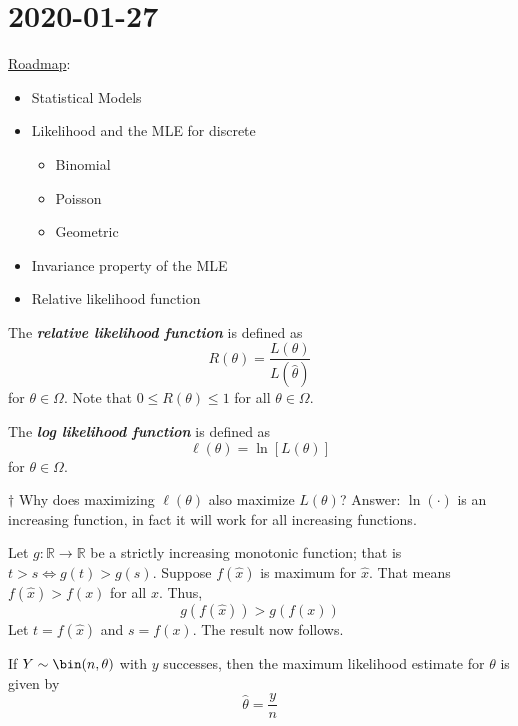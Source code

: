 \section{2020-01-27}
\underline{Roadmap}:
\begin{itemize}
    \item Statistical Models
    \item Likelihood and the MLE for discrete
          \begin{itemize}
              \item Binomial
              \item Poisson
              \item Geometric
          \end{itemize}
    \item Invariance property of the MLE
    \item Relative likelihood function
\end{itemize}

\begin{Definition}{}{}
    The \textbf{\emph{relative likelihood function}} is defined as
    \[ R(\theta)=\frac{L(\theta)}{L(\hat{\theta})} \]
    for $ \theta\in\Omega $. Note that $ 0\leqslant R(\theta)\leqslant 1 $
    for all $ \theta\in\Omega $.
\end{Definition}


\begin{Definition}{}{}
    The \textbf{\emph{log likelihood function}} is defined as
    \[ \ell(\theta)=\ln\left[ L(\theta) \right] \]
    for $ \theta\in\Omega $.
\end{Definition}

$ \dagger $ Why does maximizing $ \ell(\theta) $ also maximize $ L(\theta) $?
Answer: $ \ln(\cdot) $ is an increasing function, in fact it will work for all increasing functions.

Let $ g:\mathbb{R}\to\mathbb{R} $ be a strictly increasing monotonic function;
that is $ t>s \iff g(t)>g(s) $. Suppose $ f(\hat{x}) $ is maximum for $ \hat{x} $.
That means $ f(\hat{x})>f(x) $ for all $ x $. Thus,
\[ g(f(\hat{x}))>g(f(x)) \]
Let $ t=f(\hat{x}) $ and $ s=f(x) $. The result now follows.


\begin{Proposition}{}{}
    If $ Y \sim \bin(n,\theta) $ with $ y $ successes, then the
    maximum likelihood estimate for $ \theta $ is given by
    \[ \hat{\theta}=\frac{y}{n} \]
\end{Proposition}

